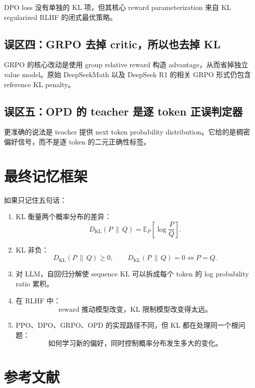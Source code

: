 \documentclass[11pt,a4paper]{ctexart}
\newcommand{\KL}[2]{D_{\mathrm{KL}}\!\left(#1\,\middle\|\,#2\right)}
\newcommand{\E}{\mathbb{E}}
\begin{document}
DPO loss 没有单独的 KL 项，但其核心 reward parameterization 来自 KL regularized RLHF 的闭式最优策略。

\subsection{误区四：GRPO 去掉 critic，所以也去掉 KL}

GRPO 的核心改动是使用 group relative reward 构造 advantage，从而省掉独立 value model。原始 DeepSeekMath 以及 DeepSeek R1 的相关 GRPO 形式仍包含 reference KL penalty。

\subsection{误区五：OPD 的 teacher 是逐 token 正误判定器}

更准确的说法是 teacher 提供 next token probability distribution。它给的是稠密偏好信号，而不是逐 token 的二元正确性标签。

\section{最终记忆框架}

如果只记住五句话：

\begin{enumerate}
    \item KL 衡量两个概率分布的差异：
    \[
    \KL{P}{Q}
    =
    \E_{P}
    \left[
    \log\frac{P}{Q}
    \right].
    \]

    \item KL 非负：
    \[
    \KL{P}{Q}\ge0,
    \qquad
    \KL{P}{Q}=0\iff P=Q.
    \]

    \item 对 LLM，自回归分解使 sequence KL 可以拆成每个 token 的 log probability ratio 累积。

    \item 在 RLHF 中：
    \[
    \text{reward 推动模型改变，KL 限制模型改变得太远。}
    \]

    \item PPO、DPO、GRPO、OPD 的实现路径不同，但 KL 都在处理同一个根问题：
    \[
    \boxed{
    \text{如何学习新的偏好，同时控制概率分布发生多大的变化。}
    }
    \]
\end{enumerate}

\section{参考文献}
\end{document}
